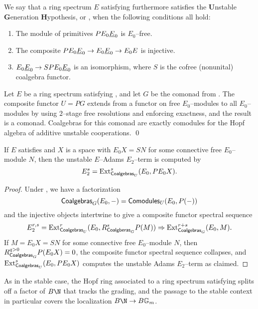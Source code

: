 \begin{definition}
We say that a ring spectrum $E$ satisfying {\UFH} furthermore satisfies the \textbf{U}nstable \textbf{G}eneration \textbf{H}ypothesis, or {\UGH}, when the following conditions all hold:
\begin{enumerate}
    \item The module of primitives $P E_0 \underline{\smash{E}}_{0}$ is $E_0$--free.
    \item The composite $P E_0 \underline{\smash{E}}_{0} \to E_0 \underline{\smash{E}}_{0} \to E_0 E$ is injective.
    \item $E_0 \underline{\smash{E}}_{0} \to SP E_0 \underline{\smash{E}}_{0}$ is an isomorphism, where $S$ is the cofree (nonunital) coalgebra functor.
\end{enumerate}
\end{definition}

\begin{lemma}
Let $E$ be a ring spectrum satisfying {\UGH}, and let $G$ be the comonad from .  The composite functor $U = P G$ extends from a functor on free $E_0$--modules to all $E_0$--modules by using $2$--stage free resolutions and enforcing exactness, and the result is a comonad.  Coalgebras for this comonad are exactly comodules for the Hopf algebra of additive unstable cooperations. \qed
\end{lemma}

\begin{corollary}
If $E$ satisfies {\UGH} and $X$ is a space with $E_0 X = SN$ for some connective free $E_0$--module $N$, then the unstable $E$--Adams $E_2$--term is computed by \[E_2^s = \operatorname{Ext}^s_{\mathsf{Coalgebras}_U}(E_0, P E_0 X).\]
\end{corollary}
\begin{proof}
Under {\UGH}, we have a factorization \[\mathsf{Coalgebras}_{G}(E_0, -) = \mathsf{Comodules}_{U}(E_0, P(-))\] and the injective objects intertwine to give a composite functor spectral sequence \[E_2^{r, s} = \operatorname{Ext}^r_{\mathsf{Coalgebras}_U}(E_0, R^s_{\mathsf{Coalgberas}_G} P(M)) \Rightarrow \operatorname{Ext}^{r+s}_{\mathsf{Coalgebras}_G}(E_0, M).\]  If $M = E_0 X = SN$ for some connective free $E_0$--module $N$, then $R^{q > 0}_{\mathsf{Coalgebras}_G} P(E_0 X) = 0$, the composite functor spectral sequence collapses, and $\operatorname{Ext}^s_{\mathsf{Coalgebras}_U}(E_0, P E_0 X)$ computes the unstable Adams $E_2$--term as claimed.
\end{proof}

\begin{remark}
As in the stable case, the Hopf ring associated to a ring spectrum satisfying {\UFH} splits off a factor of $B\N$ that tracks the grading, and the passage to the stable context in particular covers the localization $B\N \to B\Gm$.
\end{remark}

